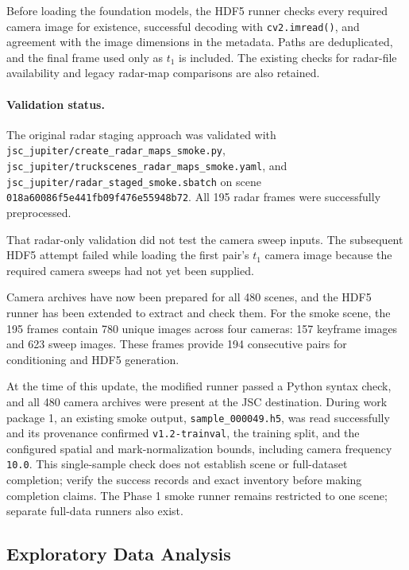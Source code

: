 \documentclass[11pt,a4paper]{article}
\begin{document}
Before loading the foundation models, the HDF5 runner checks every
required camera image for existence, successful decoding with
\texttt{cv2.imread()}, and agreement with the image dimensions in
the metadata. Paths are deduplicated, and the final frame used only
as $t_1$ is included. The existing checks for radar-file availability
and legacy radar-map comparisons are also retained.

\paragraph{Validation status.}

The original radar staging approach was validated with
\texttt{jsc\_jupiter/create\_radar\_maps\_smoke.py},
\texttt{jsc\_jupiter/truckscenes\_radar\_maps\_smoke.yaml}, and
\texttt{jsc\_jupiter/radar\_staged\_smoke.sbatch} on scene
\texttt{018a60086f5e441fb09f476e55948b72}. All 195 radar frames were
successfully preprocessed.

That radar-only validation did not test the camera sweep inputs.
The subsequent HDF5 attempt failed while loading the first pair's
$t_1$ camera image because the required camera sweeps had not yet
been supplied.

Camera archives have now been prepared for all 480 scenes, and
the HDF5 runner has been extended to extract and check them.
For the smoke scene, the 195 frames contain 780 unique images
across four cameras: 157 keyframe images and 623 sweep images.
These frames provide 194 consecutive pairs for conditioning and
HDF5 generation.

At the time of this update, the modified runner passed a Python
syntax check, and all 480 camera archives were present at the JSC
destination. During work package 1, an existing smoke output,
\texttt{sample\_000049.h5}, was read successfully and its provenance
confirmed \texttt{v1.2-trainval}, the training split, and the configured
spatial and mark-normalization bounds, including camera frequency
\texttt{10.0}. This single-sample check does not establish scene or
full-dataset completion; verify the success records and exact inventory
before making completion claims. The Phase 1 smoke runner remains
restricted to one scene; separate full-data runners also exist.


\subsection{Exploratory Data Analysis}
\end{document}
